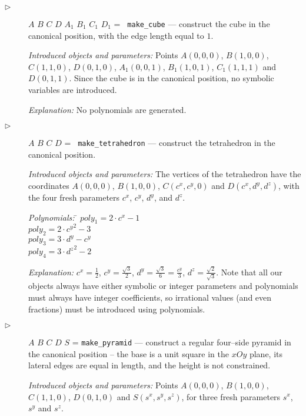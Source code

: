 \documentclass[final,1p,times,authoryear]{elsarticle}
\begin{document}
\begin{description}
\item[$\triangleright$] $A$ $B$ $C$ $D$ $A_1$ $B_1$ $C_1$ $D_1$ = {\tt
    make\_cube} --- construct the cube in the canonical position, with
  the edge length equal to $1$.

  {\em Introduced objects and parameters:} Points $A(0, 0, 0)$,
  $B(1, 0, 0)$, $C(1, 1, 0)$, $D(0, 1, 0)$, $A_1(0, 0, 1)$,
  $B_1(1, 0, 1)$, $C_1(1, 1, 1)$ and $D(0, 1, 1)$. Since the cube is
  in the canonical position, no symbolic variables are introduced.

  {\em Explanation:} No polynomials are generated.

\item[$\triangleright$] $A$ $B$ $C$ $D$ = {\tt
    make\_tetrahedron} \label{tetrahedron} --- construct the
  tetrahedron in the
  canonical position.

  {\em Introduced objects and parameters:} The vertices of the
  tetrahedron have the coordinates $A(0, 0, 0)$, $B(1, 0, 0)$,
  $C(c^x, c^y, 0)$ and $D(c^x, d^y, d^z)$, with the four fresh
  parameters $c^x$, $c^y$, $d^y$, and $d^z$.

\begin{tabbing}
{\em Polynomials:} \= $poly_1 = 2\cdot c^x - 1$ \\
                   \> $poly_2 = 2\cdot {c^y}^2 - 3$ \\
                   \> $poly_3 = 3\cdot d^y - c^y$ \\
                   \> $poly_4 = 3\cdot {d^z}^2 - 2$
\end{tabbing}

{\em Explanation:} $c^x = \frac{1}{2}$, $c^y = \frac{\sqrt{3}}{2}$,
$d^y = \frac{\sqrt{3}}{6} = \frac{c^y}{3}$,
$d^z = \frac{\sqrt{2}}{\sqrt{3}}$. Note that all our objects always
have either symbolic or integer parameters and polynomials must always
have integer coefficients, so irrational values (and even fractions)
must be introduced using polynomials.

\item[$\triangleright$] $A$ $B$ $C$ $D$ $S$ = {\tt make\_pyramid} ---
  construct a regular four--side pyramid in the canonical position --
  the base is a unit square in the $xOy$ plane, its lateral edges are
  equal in length, and the height is not constrained.

  {\em Introduced objects and parameters:} Points $A(0, 0, 0)$,
  $B(1, 0, 0)$, $C(1, 1, 0)$, $D(0, 1, 0)$ and $S(s^x, s^y, s^z)$, for
  three fresh parameters $s^x$, $s^y$ and $s^z$.


\end{description}
\end{document}
